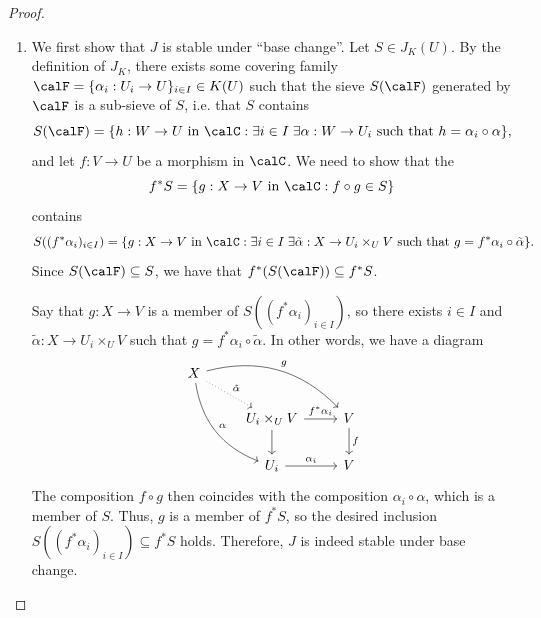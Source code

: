 \begin{proof}
    \begin{enumerate}
        \item We first show that $J$ is stable under ``base change''. Let $S \in J_K(U)$. By the definition of $J_K$, there exists some covering family $\calF = \{\alpha_i: U_i \to U\}_{i \in I} \in K(U)$ such that the sieve $S(\calF)$ generated by $\calF$ is a sub-sieve of $S$, i.e. that $S$ contains 
        $$S(\calF) =  \{h: W \to U \text{ in } \calC: \exists i \in I \; \exists \alpha: W \to U_i \text{ such that } h = \alpha_i \circ \alpha\},$$
        and let $f: V \to U$ be a morphism in $\calC$. We need to show that the  
        $$f^* S = \{g: X \to V \text{ in } \calC: f \circ g \in S\}$$
        contains 
        $$S((f^* \alpha_i)_{i \in I}) = \{g: X \to V \text{ in } \calC: \exists i \in I \; \exists \tilde{\alpha} : X \to U_i \times_U V \text{ such that } g = f^* \alpha_i \circ \tilde{\alpha} \}.$$
        Since $S(\calF) \subseteq S$, we have that $f^*(S(\calF)) \subseteq f^* S$. 

        Say that $g: X \to V$ is a member of $S((f^* \alpha_i)_{i \in I})$, so there exists $i \in I$ and $\widetilde{\alpha}: X \to U_i \times_U V$ such that $g = f^* \alpha_i \circ \tilde{\alpha}$. In other words, we have a diagram 
        \begin{equation} 
        \begin{tikzcd}
            X \ar[rrd, bend left, "g"] \ar[ddr, bend right, "\alpha"] \ar[dr, dotted, "\tilde{\alpha}"] & & \\
            & U_i \times_U V \ar[r, "f^* \alpha_i"] \ar[d] & V \ar[d, "f"] \\
            & U_i \ar[r, "\alpha_i"] & V
        \end{tikzcd}
        \end{equation}
        The composition $f \circ g$ then coincides with the composition $\alpha_i \circ \alpha$, which is a member of $S$. Thus, $g$ is a member of $f^* S$, so the desired inclusion $S((f^* \alpha_i)_{i \in I}) \subseteq f^* S$ holds. Therefore, $J$ is indeed stable under base change. 
        


\end{enumerate}
\end{proof}
